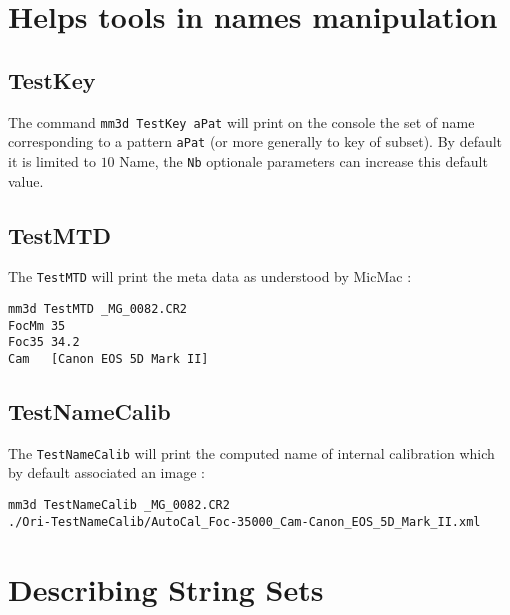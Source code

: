 \section{Helps tools in names manipulation}


\subsection{TestKey}

The command {\tt mm3d TestKey aPat} will print on the console the set
of name corresponding to a pattern  {\tt aPat}  (or more generally to key of subset). By
default it is limited to $10$ Name, the {\tt Nb} optionale parameters can
increase this default value.

\subsection{TestMTD}

The {\tt TestMTD} will print the meta data as understood by MicMac :

\begin{verbatim}
mm3d TestMTD _MG_0082.CR2 
FocMm 35
Foc35 34.2
Cam   [Canon EOS 5D Mark II]
\end{verbatim}


\subsection{TestNameCalib}
\label{TestNameCalib}

The {\tt TestNameCalib} will print the computed name of internal calibration which by default associated
an image :


\begin{verbatim}
mm3d TestNameCalib _MG_0082.CR2
./Ori-TestNameCalib/AutoCal_Foc-35000_Cam-Canon_EOS_5D_Mark_II.xml
\end{verbatim}




\section{Describing String Sets}


